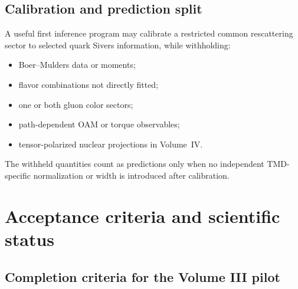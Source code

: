 \documentclass[11pt]{article}
\begin{document}
\subsection{Calibration and prediction split}

A useful first inference program may calibrate a restricted common
rescattering sector to selected quark Sivers information, while withholding:
\begin{itemize}
\item Boer--Mulders data or moments;
\item flavor combinations not directly fitted;
\item one or both gluon color sectors;
\item path-dependent OAM or torque observables;
\item tensor-polarized nuclear projections in Volume~IV.
\end{itemize}
The withheld quantities count as predictions only when no independent TMD-
specific normalization or width is introduced after calibration.

\section{Acceptance criteria and scientific status}
\label{sec:acceptance}

\subsection{Completion criteria for the Volume III pilot}
\end{document}
